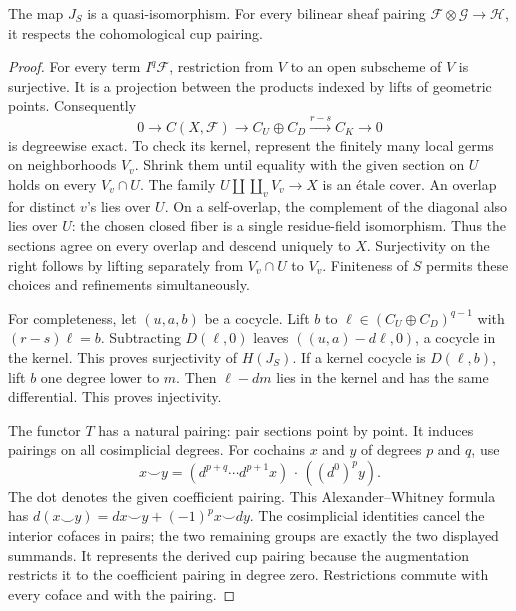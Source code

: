 \begin{proposition}
\label{prop:do27-gluing}
The map \(J_S\) is a quasi-isomorphism. For every bilinear sheaf
pairing \(\mathcal F\otimes\mathcal G\to\mathcal H\), it respects
the cohomological cup pairing.
\end{proposition}

\begin{proof}
For every term \(I^q\mathcal F\), restriction from \(V\) to an open
subscheme of \(V\) is surjective. It is a projection between the
products indexed by lifts of geometric points. Consequently
\[
 0\longrightarrow C(X,\mathcal F)
 \longrightarrow C_U\oplus C_D
 \xrightarrow{r-s}C_K\longrightarrow0
\]
is degreewise exact. To check its kernel, represent the finitely many
local germs on neighborhoods \(V_v\). Shrink them until equality
with the given section on \(U\) holds on every \(V_v\cap U\).
The family \(U\amalg\coprod_vV_v\to X\) is an \'etale cover.
An overlap for distinct \(v\)'s lies over \(U\). On a self-overlap,
the complement of the diagonal also lies over \(U\): the chosen
closed fiber is a single residue-field isomorphism. Thus the sections
agree on every overlap and descend uniquely to \(X\).
Surjectivity on the right follows by lifting separately from
\(V_v\cap U\) to \(V_v\). Finiteness of \(S\) permits these
choices and refinements simultaneously.

For completeness, let \((u,a,b)\) be a cocycle. Lift \(b\) to
\(\ell\in(C_U\oplus C_D)^{q-1}\) with \((r-s)\ell=b\).
Subtracting \(D(\ell,0)\) leaves \(((u,a)-d\ell,0)\), a
cocycle in the kernel. This proves surjectivity of \(H(J_S)\).
If a kernel cocycle is \(D(\ell,b)\), lift \(b\) one degree lower
to \(m\). Then \(\ell-dm\) lies in the kernel and has the same
differential. This proves injectivity.

The functor \(T\) has a natural pairing: pair sections point by
point. It induces pairings on all cosimplicial degrees. For cochains
\(x\) and \(y\) of degrees \(p\) and \(q\), use
\[
 x\smile y=
 (d^{p+q}\cdots d^{p+1}x)\,\cdot\,((d^0)^py).
\]
The dot denotes the given coefficient pairing. This
Alexander--Whitney formula has
\(d(x\smile y)=dx\smile y+(-1)^px\smile dy\).
The cosimplicial identities cancel the interior cofaces in pairs;
the two remaining groups are exactly the two displayed summands.
It represents the derived cup pairing because the augmentation
restricts it to the coefficient pairing in degree zero.
Restrictions commute with every coface and with the pairing.


\end{proof}
